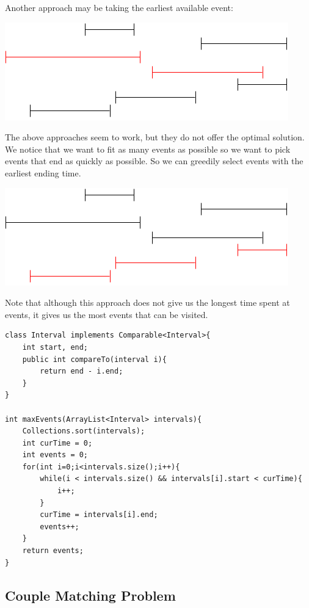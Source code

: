 \documentclass[11pt,oneside]{book}
\makeatletter
\def\maxwidth#1{\ifdim\Gin@nat@width>#1 #1\else\Gin@nat@width\fi}
\makeatother
\begin{document}
Another approach may be taking the earliest available event:

\vspace{5px}\includegraphics[width=\maxwidth{\textwidth}]{intervalschedule3.png}

The above approaches seem to work, but they do not offer the optimal solution.  We notice that we want to fit as many events as possible so we want to pick events that end as quickly as possible. So we can greedily select events with the earliest ending time.

\vspace{5px}\includegraphics[width=\maxwidth{\textwidth}]{intervalschedule4.png}

Note that although this approach does not give us the longest time spent at events, it gives us the most events that can be visited.

\begin{lstlisting}
class Interval implements Comparable<Interval>{
    int start, end;
    public int compareTo(interval i){
        return end - i.end;
    }
}

int maxEvents(ArrayList<Interval> intervals){
    Collections.sort(intervals);
    int curTime = 0;
    int events = 0;
    for(int i=0;i<intervals.size();i++){
        while(i < intervals.size() && intervals[i].start < curTime){
            i++;
        }
        curTime = intervals[i].end;
        events++;
    }
    return events;
}
\end{lstlisting}

\subsection{Couple Matching Problem}
\end{document}
